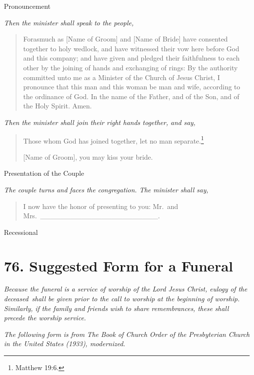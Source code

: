 \documentclass[
]{book}
\begin{document}
Pronouncement

\emph{Then the minister shall speak to the people,}

\begin{quote}
Forasmuch as {[}Name of Groom{]} and {[}Name of Bride{]} have consented together to holy wedlock, and have witnessed their vow here before God and this company; and have given and pledged their faithfulness to each other by the joining of hands and exchanging of rings: By the authority committed unto me as a Minister of the Church of Jesus Christ, I pronounce that this man and this woman be man and wife, according to the ordinance of God. In the name of the Father, and of the Son, and of the Holy Spirit. Amen.
\end{quote}

\emph{Then the minister shall join their right hands together, and say,}

\begin{quote}
Those whom God has joined together, let no man separate.\footnote{Matthew 19:6.}

{[}Name of Groom{]}, you may kiss your bride.
\end{quote}

Presentation of the Couple

\emph{The couple turns and faces the congregation. The minister shall say,}

\begin{quote}
I now have the honor of presenting to you: Mr.~and Mrs.~\_\_\_\_\_\_\_\_\_\_\_\_\_\_\_\_\_\_\_\_\_\_\_.
\end{quote}

Recessional

\hypertarget{suggested-form-for-a-funeral}{%
\section*{76. Suggested Form for a Funeral}\label{suggested-form-for-a-funeral}}

\protect\hypertarget{chapter-slug-76-suggested-form-for-a-funeral}{\href{}{}}

\protect\hypertarget{76}{\href{}{}}\emph{Because the funeral is a service of worship of the Lord Jesus Christ, eulogy of the deceased~shall be given prior to the call to worship at the beginning of worship. Similarly, if the family and friends wish to share remembrances, these shall precede the worship service.}

\emph{The following form is from The Book of Church Order of the Presbyterian Church in the United States (1933), modernized.}
\end{document}
